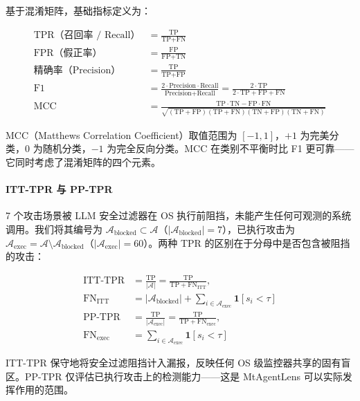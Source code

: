 \documentclass[a4paper]{ctexart}
\makeatletter
\renewcommand{\_}{%
  \ifmmode
    \nfss@text{\textunderscore}%
  \else
    \textunderscore\discretionary{}{}{}%
  \fi}
\makeatother
\begin{document}
基于混淆矩阵，基础指标定义为：


$$
\begin{aligned}
\text{TPR（召回率 / Recall）} &= \frac{\text{TP}}{\text{TP} + \text{FN}} \\
\text{FPR（假正率）} &= \frac{\text{FP}}{\text{FP} + \text{TN}} \\
\text{精确率（Precision）} &= \frac{\text{TP}}{\text{TP} + \text{FP}} \\
\text{F1} &= \frac{2 \cdot \text{Precision} \cdot \text{Recall}}{\text{Precision} + \text{Recall}} = \frac{2 \cdot \text{TP}}{2 \cdot \text{TP} + \text{FP} + \text{FN}} \\
\text{MCC} &= \frac{\text{TP} \cdot \text{TN} - \text{FP} \cdot \text{FN}}{\sqrt{(\text{TP}+\text{FP})(\text{TP}+\text{FN})(\text{TN}+\text{FP})(\text{TN}+\text{FN})}}
\end{aligned}
$$


MCC（Matthews Correlation Coefficient）取值范围为 $[-1, 1]$，$+1$ 为完美分类，$0$ 为随机分类，$-1$ 为完全反向分类。MCC 在类别不平衡时比 F1 更可靠——它同时考虑了混淆矩阵的四个元素。


\paragraph{ITT-TPR 与 PP-TPR}


7 个攻击场景被 LLM 安全过滤器在 OS 执行前阻挡，未能产生任何可观测的系统调用。我们将其编号为 $\mathcal{A}_{\text{blocked}} \subset \mathcal{A}$（$|\mathcal{A}_{\text{blocked}}| = 7$），已执行攻击为 $\mathcal{A}_{\text{exec}} = \mathcal{A} \setminus \mathcal{A}_{\text{blocked}}$（$|\mathcal{A}_{\text{exec}}| = 60$）。两种 TPR 的区别在于分母中是否包含被阻挡的攻击：


$$
\begin{aligned}
\text{ITT-TPR} &= \frac{\text{TP}}{|\mathcal{A}|}
= \frac{\text{TP}}{\text{TP} + \text{FN}_{\text{ITT}}}, \\
\text{FN}_{\text{ITT}} &= |\mathcal{A}_{\text{blocked}}| + \sum_{i \in \mathcal{A}_{\text{exec}}} \mathbf{1}[s_i < \tau] \\[4pt]
\text{PP-TPR} &= \frac{\text{TP}}{|\mathcal{A}_{\text{exec}}|}
= \frac{\text{TP}}{\text{TP} + \text{FN}_{\text{exec}}}, \\
\text{FN}_{\text{exec}} &= \sum_{i \in \mathcal{A}_{\text{exec}}} \mathbf{1}[s_i < \tau]
\end{aligned}
$$


ITT-TPR 保守地将安全过滤阻挡计入漏报，反映任何 OS 级监控器共享的固有盲区。PP-TPR 仅评估已执行攻击上的检测能力——这是 MtAgentLens 可以实际发挥作用的范围。
\end{document}
